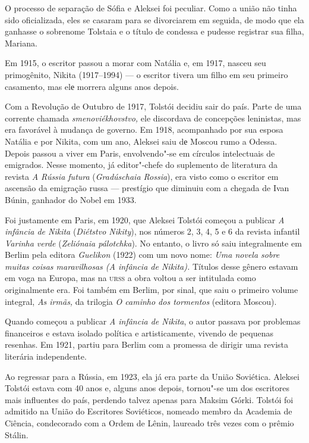 O processo de separação de Sófia e Aleksei foi peculiar. Como a união
não tinha sido oficializada, eles se casaram para se divorciarem em
seguida, de modo que ela ganhasse o sobrenome Tolstaia e o título de
condessa e pudesse registrar sua filha, Mariana.

Em 1915, o escritor passou a morar com Natália e, em 1917, nasceu seu
primogênito, Nikita (1917--1994) --- o escritor tivera um filho em seu
primeiro casamento, mas elе morrera alguns anos depois.

Com a Revolução de Outubro de 1917, Tolstói decidiu sair do país. Parte
de uma corrente chamada \emph{smenoviékhovstvo,} ele discordava de
concepções leninistas, mas era favorável à mudança de governo. Em 1918,
acompanhado por sua esposa Natália e por Nikita, com um ano, Aleksei
saiu dе Moscou rumo a Odessa. Depois passou a viver em Paris,
envolvendo"-se em círculos intelectuais de emigrados. Nesse momento, já
editor"-chefe do suplemento de literatura da revista \emph{A Rússia
futura} (\emph{Gradúschaia Rossia}), era visto como o escritor em
ascensão da emigração russa --- prestígio que diminuiu com a
chegada de Ivan Búnin, ganhador do Nobel em 1933.

Foi justamente em Paris, em 1920, que Aleksei Tolstói começou a publicar
\emph{A infância de Nikita} (\emph{Diétstvo Nikity}), nos números 2, 3,
4, 5 e 6 da revista infantil \emph{Varinha verde} (\emph{Zeliónaia
pálotchka}). No entanto, o livro só saiu integralmente em Berlim pela
editora \emph{Guelikon} (1922) com um novo nome: \emph{Uma novela sobre
muitas coisas maravilhosas (A infância de Nikita).} Títulos desse gênero
estavam em voga na Europa, mas na \textsc{urss} a obra voltou a ser intitulada
como originalmente era. Foi também em Berlim, por sinal, que saiu o
primeiro volume integral, \emph{As irmãs,} da trilogia \emph{O caminho
dos tormentos} (editora Moscou).

Quando começou a publicar \emph{A infância de Nikita}, o autor passava
por problemas financeiros e estava isolado política e artisticamente,
vivendo de pequenas resenhas. Em 1921, partiu para Berlim com a promessa
de dirigir uma revista literária independente.

Ao regressar para a Rússia, em 1923, ela já era parte da União
Soviética. Aleksei Tolstói estava com 40 anos e, alguns anos depois,
tornou"-se um dos escritores mais influentes do país, perdendo talvez
apenas para Maksim Górki. Tolstói foi admitido na União do Escritores
Soviéticos, nomeado membro da Academia de Ciência, condecorado com a
Ordem de Lênin, laureado três vezes com o prêmio Stálin.

